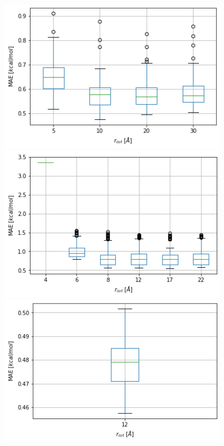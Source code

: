 \begin{figure}[!htb]
    \includegraphics[width=1.0\textwidth]{figures/regression/snap/cut-all.png} %
  \endminipage\hfill
    \includegraphics[width=1.0\textwidth]{figures/regression/snap/cut-sphere.png}
  \endminipage\hfill
    \includegraphics[width=1.0\textwidth]{figures/regression/snap/cut_12.png} %

\end{figure}
